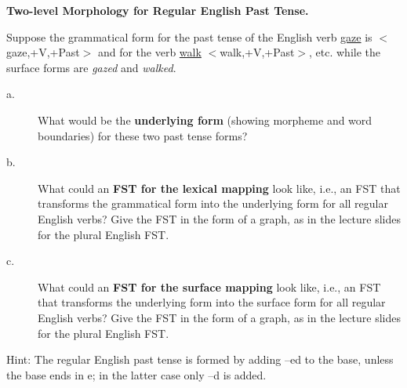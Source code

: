 \documentclass[11pt]{article}
\begin{document}
\begin{solution}
\begin{description}
\end{description}

\end{solution}

\vspace*{0.5cm}

\begin{problem}{7}
\textbf{Two-level Morphology for Regular English Past Tense.}

Suppose the grammatical form for the past tense of the English verb \underline{gaze} is $<$gaze,+V,+Past$>$ and for the verb \underline{walk} $<$walk,+V,+Past$>$, etc. while the surface forms are \textit{gazed} and \textit{walked}.

\begin{description}
	\item[a.] What would be the \textbf{underlying form} (showing morpheme and word boundaries) for these two past tense forms?
	
	\item[b.] What could an \textbf{FST for the lexical mapping} look like, i.e., an FST that transforms the grammatical form into the underlying form for all regular English verbs? Give the FST in the form of a graph, as in the lecture slides for the plural English FST.
	
	\item[c.] What could an \textbf{FST for the surface mapping} look like, i.e., an FST that transforms the underlying form into the surface form for all regular English verbs? Give the FST in the form of a graph, as in the lecture slides for the plural English FST.
\end{description}

Hint: The regular English past tense is formed by adding –ed to the base, unless the base ends in e; in the latter case only –d is added.

\end{problem}
\end{document}

